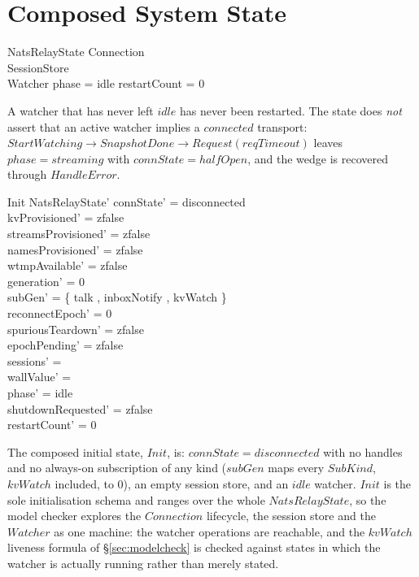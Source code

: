 \documentclass[a4paper,10pt,fleqn]{article}
\begin{document}
\section{Composed System State}
\label{sec:composed}

\begin{schema}{NatsRelayState}
  Connection \\
  SessionStore \\
  Watcher
  \where
  phase = idle \implies restartCount = 0
\end{schema}

A watcher that has never left $idle$ has never been restarted.  The
state does \emph{not} assert that an active watcher implies a
$connected$ transport: $StartWatching \to SnapshotDone \to
Request(reqTimeout)$ leaves $phase = streaming$ with $connState =
halfOpen$, and the wedge is recovered through $HandleError$.

\begin{schema}{Init}
  NatsRelayState'
  \where
  connState' = disconnected \\
  kvProvisioned' = zfalse \\
  streamsProvisioned' = zfalse \\
  namesProvisioned' = zfalse \\
  wtmpAvailable' = zfalse \\
  generation' = 0 \\
  subGen' = \{ talk , inboxNotify , kvWatch  \} \\
  reconnectEpoch' = 0 \\
  spuriousTeardown' = zfalse \\
  epochPending' = zfalse \\
  sessions' = \emptyset \\
  wallValue' = \emptyset \\
  phase' = idle \\
  shutdownRequested' = zfalse \\
  restartCount' = 0
\end{schema}

The composed initial state, $Init$, is: $connState = disconnected$ with no
handles and no always-on subscription of any kind ($subGen$ maps every
$SubKind$, $kvWatch$ included, to $0$), an empty session store, and an
$idle$ watcher.  $Init$ is the sole initialisation schema and ranges over
the whole $NatsRelayState$, so the model checker explores the $Connection$
lifecycle, the session store and the $Watcher$ as one machine: the watcher
operations are reachable, and the $kvWatch$ liveness formula of
\S\ref{sec:modelcheck} is checked against states in which the watcher is
actually running rather than merely stated.
\end{document}
